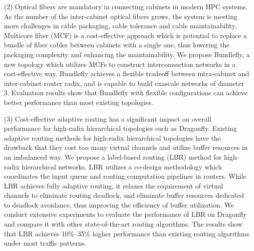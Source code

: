 \begin{eabstract}
  (2)
  Optical fibers are mandatory in connecting cabinets in modern HPC systems.
  As the number of the inter-cabinet optical fibers grows,
  the system is meeting more challenges in cable packaging, cable tolerance
  and cable maintainability.
  Multicore fiber (MCF) is a cost-effective
  approach which is potential to replace a bundle of fiber
  cables between cabinets with a single one,
  thus lowering the packaging complexity and enhancing the maintainability.
  We propose Bundlefly, a new topology
  which utilizes MCFs to construct interconnection networks in a cost-effective way.
  Bundlefly achieves a flexible tradeoff between
  intra-cabinet and inter-cabinet router radix,
  and is capable to build exascale networks of diameter 3.
  Evaluation results show that Bundlefly with flexible configurations
  can achieve better performance than most existing topologies.

  (3) Cost-effective adaptive routing has a significant
  impact on overall performance for high-radix hierarchical topologies such as Dragonfly.
  Existing adaptive routing methods for high-radix hierarchical
  topologies have the drawback that they cost too many virtual channels
  and utilize buffer resources in an imbalanced way.
  We propose a label-based routing (LBR) method for high-radix hierarchical networks.
  LBR utilizes a co-design methodology which coordinates
  the input queue and routing computation pipelines in routers.
  While LBR achieves fully adaptive routing,
  it relaxes the requirement of virtual channels to eliminate routing deadlock,
  and eliminate buffer resources dedicated to deadlock avoidance,
  thus improving the efficiency of buffer utilization.
  We conduct extensive experiments to evaluate the performance
  of LBR on Dragonfly and compare it with other state-of-the-art routing algorithms.
  The results show that LBR achieves 10\%–35\% higher
  performance than existing routing algorithms under most
  traffic patterns.

\end{eabstract}

